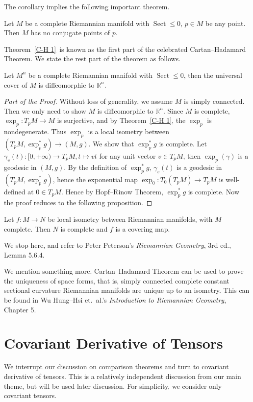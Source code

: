 The corollary implies the following important theorem.
\begin{thm}\label{C-H 1}
    Let $M$ be a complete Riemannian manifold with $\operatorname{Sect}\leq 0$, $p\in M$ be any point.
    Then $M$ has no conjugate points of $p$.
\end{thm}

Theorem~\ref{C-H 1}~is known as the first part of the celebrated Cartan--Hadamard Theorem.
We state the rest part of the theorem as follows.
\begin{thm}
    Let $M^n$ be a complete Riemannian manifold with $\operatorname{Sect}\leq 0$, then the universal cover of $M$ is diffeomorphic to $\mathbb{R}^n$.
\end{thm}
\begin{proof}[Part of the Proof]
    Without loss of generality, we assume $M$ is simply connected.
    Then we only need to show $M$ is diffeomorphic to $\mathbb{R}^n$.
    Since $M$ is complete, $\exp_p:T_pM\to M$ is surjective, and by Theorem~\ref{C-H 1}, the $\exp_p$ is nondegenerate.
    Thus $\exp_p$ is a local isometry between $(T_pM,\exp_p^*g)\to(M,g)$.
    We show that $\exp_p^*g$ is complete.
    Let $\gamma_v(t):[0,+\infty)\to T_pM, t\mapsto vt$ for any unit vector $v\in T_pM$, then $\exp_p(\gamma)$ is a geodesic in $(M,g)$.
    By the definition of $\exp_p^*g$, $\gamma_v(t)$ is a geodesic in $(T_pM,\exp_p^*g)$, hence the exponential map $\exp_0:T_0(T_pM)\to T_pM$ is well-defined at $0\in T_pM$.
    Hence by Hopf--Rinow Theorem, $\exp_p^*g$ is complete.
    Now the proof reduces to the following proposition.
\end{proof}

\begin{prop}
    Let $f:M\to N$ be local isometry between Riemannian manifolds, with $M$ complete.
    Then $N$ is complete and $f$ is a covering map.
\end{prop}

We stop here, and refer to Peter Peterson's \emph{Riemannian Geometry}, 3rd ed., Lemma 5.6.4.

We mention something more.
Cartan--Hadamard Theorem can be used to prove the uniqueness of space forms, that is, simply connected complete constant sectional curvature Riemannian manifolds are unique up to an isometry.
This can be found in Wu Hung--Hsi et.\ al.'s \emph{Introduction to Riemannian Geometry}, Chapter 5.

\section{Covariant Derivative of Tensors}
We interrupt our discussion on comparison theorems and turn to covariant derivative of tensors.
This is a relatively independent discussion from our main theme, but will be used later discussion.
For simplicity, we consider only covariant tensors.


